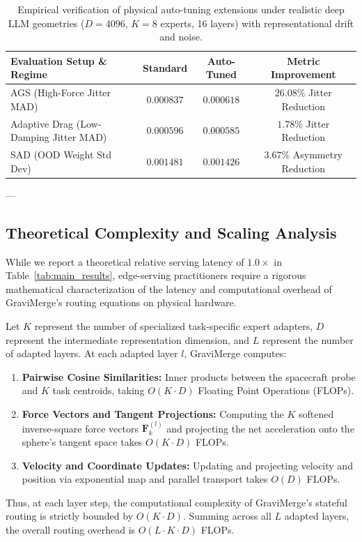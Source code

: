 \begin{table}[h]
\centering
\caption{Empirical verification of physical auto-tuning extensions under realistic deep LLM geometries ($D = 4096$, $K = 8$ experts, 16 layers) with representational drift and noise.}
\label{tab:high_dim_autotune}
\vskip 0.05in
\begin{small}
\begin{sc}
\setlength{\tabcolsep}{3pt}
\begin{tabular}{lccc}
\toprule
Evaluation Setup \& Regime & Standard & Auto-Tuned & Metric Improvement \\
\midrule
AGS (High-Force Jitter MAD) & $0.000837$ & $\mathbf{0.000618}$ & $\mathbf{26.08\%}$ Jitter Reduction \\
Adaptive Drag (Low-Damping Jitter MAD) & $0.000596$ & $\mathbf{0.000585}$ & $\mathbf{1.78\%}$ Jitter Reduction \\
SAD (OOD Weight Std Dev) & $0.001481$ & $\mathbf{0.001426}$ & $\mathbf{3.67\%}$ Asymmetry Reduction \\
\bottomrule
\end{tabular}
\end{sc}
\end{small}
\end{table}

---

\subsection{Theoretical Complexity and Scaling Analysis}
\label{sec:appendix_complexity}
While we report a theoretical relative serving latency of $1.0\times$ in Table~\ref{tab:main_results}, edge-serving practitioners require a rigorous mathematical characterization of the latency and computational overhead of GraviMerge's routing equations on physical hardware.

Let $K$ represent the number of specialized task-specific expert adapters, $D$ represent the intermediate representation dimension, and $L$ represent the number of adapted layers. At each adapted layer $l$, GraviMerge computes:
\begin{enumerate}
    \item \textbf{Pairwise Cosine Similarities:} Inner products between the spacecraft probe and $K$ task centroids, taking $O(K \cdot D)$ Floating Point Operations (FLOPs).
    \item \textbf{Force Vectors and Tangent Projections:} Computing the $K$ softened inverse-square force vectors $\mathbf{F}_k^{(l)}$ and projecting the net acceleration onto the sphere's tangent space takes $O(K \cdot D)$ FLOPs.
    \item \textbf{Velocity and Coordinate Updates:} Updating and projecting velocity and position via exponential map and parallel transport takes $O(D)$ FLOPs.
\end{enumerate}
Thus, at each layer step, the computational complexity of GraviMerge's stateful routing is strictly bounded by $O(K \cdot D)$. Summing across all $L$ adapted layers, the overall routing overhead is $O(L \cdot K \cdot D)$ FLOPs.

